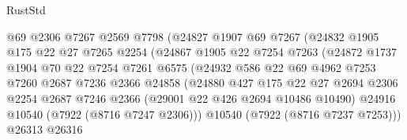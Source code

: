 \begin{lexlean}{RustStd}
\begin{coremodule}
                              @69
                              @2306
                              @7267
                              @2569
                              @7798
                              (@24827
                                @1907
                                @69
                                @7267
                                (@24832
                                  @1905
                                  @175
                                  @22
                                  @27
                                  @7265
                                  @2254
                                  (@24867
                                    @1905
                                    @22
                                    @7254
                                    @7263
                                    (@24872
                                      @1737
                                      @1904
                                      @70
                                      @22
                                      @7254
                                      @7261
                                      @6575
                                      (@24932
                                        @586
                                        @22
                                        @69
                                        @4962
                                        @7253
                                        @7260
                                        @2687
                                        @7236
                                        @2366
                                        @24858
                                        (@24880
                                          @427
                                          @175
                                          @22
                                          @27
                                          @2694
                                          @2306
                                          @2254
                                          @2687
                                          @7246
                                          @2366
                                          (@29001 @22 @426 @2694 @10486 @10490)
                                          @24916
                                          @10540
                                          (@7922 (@8716 @7247 @2306)))
                                        @10540
                                        (@7922 (@8716 @7237 @7253)))
                                      @26313
                                      @26316

\end{coremodule}
\end{lexlean}
